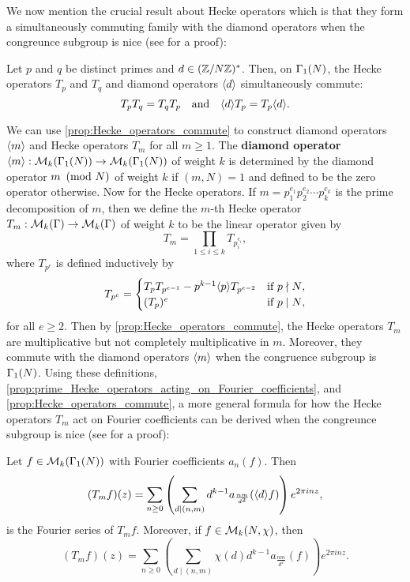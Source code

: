      We now mention the crucial result about Hecke operators which is that they form a simultaneously commuting family with the diamond operators when the congreunce subgroup is nice (see \cite{diamond2005first} for a proof):

      \begin{proposition}\label{prop:Hecke_operators_commute}
        Let $p$ and $q$ be distinct primes and $d \in (\mathbb{Z}/N\mathbb{Z})^{\ast}$. Then, on $\Gamma_{1}(N)$, the Hecke operators $T_{p}$ and $T_{q}$ and diamond operators $\langle d\rangle$ simultaneously commute:
        \[
          T_{p}T_{q} = T_{q}T_{p} \quad \text{and} \quad \langle d\rangle T_{p} = T_{p}\langle d\rangle.
        \]
      \end{proposition}

      We can use \cref{prop:Hecke_operators_commute} to construct diamond operators $\langle m\rangle$ and Hecke operators $T_{m}$ for all $m \ge 1$. The \textbf{diamond operator} $\langle m\rangle:\mathcal{M}_{k}(\Gamma_{1}(N)) \to \mathcal{M}_{k}(\Gamma_{1}(N))$ of weight $k$ is determined by the diamond operator $m \ \left(\text{mod }N\right)$ of weight $k$ if $(m,N) = 1$ and defined to be the zero operator otherwise. Now for the Hecke operators. If $m = p_{1}^{e_{1}}p_{2}^{e_{2}} \cdots p_{k}^{e_{k}}$ is the prime decomposition of $m$, then we define the $m$-th Hecke operator $T_{m}:\mathcal{M}_{k}(\Gamma) \to \mathcal{M}_{k}(\Gamma)$ of weight $k$ to be the linear operator given by
      \[
        T_{m} = \prod_{1 \le i \le k}T_{p_{i}^{e_{i}}},
      \]
      where $T_{p^{e}}$ is defined inductively by
      \[
        T_{p^{e}} = \begin{cases} T_{p}T_{p^{e-1}}-p^{k-1}\langle p\rangle T_{p^{e-2}} & \text{if $p \nmid N$}, \\ (T_{p})^{e} & \text{if $p \mid N$}, \end{cases}
      \]
      for all $e \ge 2$. Then by \cref{prop:Hecke_operators_commute}, the Hecke operators $T_{m}$ are multiplicative but not completely multiplicative in $m$. Moreover, they commute with the diamond operators $\langle m\rangle$ when the congruence subgroup is $\Gamma_{1}(N)$. Using these definitions, \cref{prop:prime_Hecke_operators_acting_on_Fourier_coefficients}, and \cref{prop:Hecke_operators_commute}, a more general formula for how the Hecke operators $T_{m}$ act on Fourier coefficients can be derived when the congreunce subgroup is nice (see \cite{diamond2005first} for a proof):

      \begin{proposition}\label{prop:general_Hecke_operators_acting_on_Fourier_coefficients}
        Let $f \in \mathcal{M}_{k}(\Gamma_{1}(N))$ with Fourier coefficients $a_{n}(f)$. Then
        \[
          (T_{m}f)(z) = \sum_{n \ge 0}\left(\sum_{d \mid (n,m)}d^{k-1}a_{\frac{nm}{d^{2}}}(\langle d\rangle f)\right)e^{2\pi inz},
        \]
        is the Fourier series of $T_{m}f$. Moreover, if $f \in \mathcal{M}_{k}(N,\chi)$, then
        \[
          (T_{m}f)(z) = \sum_{n \ge 0}\left(\sum_{d \mid (n,m)}\chi(d)d^{k-1}a_{\frac{nm}{d^{2}}}(f)\right)e^{2\pi inz}.
        \]
      \end{proposition}
